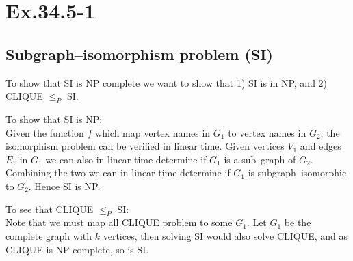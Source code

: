 \section*{Ex.34.5-1}
\subsection*{Subgraph--isomorphism problem (SI)}


To show that SI is NP complete we want to show that 1) SI is in NP, and 2) CLIQUE $\leq_P$ SI.

To show that SI is NP:
\\
Given the function $f$ which map vertex names in $G_1$ to vertex names in $G_2$, the isomorphism problem can be verified in linear time. Given vertices $V_1$ and edges $E_1$ in $G_1$ we can also in linear time determine if $G_1$ is a sub--graph of $G_2$. Combining the two we can in linear time determine if $G_1$ is subgraph--isomorphic to $G_2$. Hence SI is NP.

To see that CLIQUE $\leq_P$ SI:
\\
Note that we must map all CLIQUE problem to some $G_1$. Let $G_1$ be the complete graph with $k$ vertices, then solving SI would also solve CLIQUE, and as CLIQUE is NP complete, so is SI.